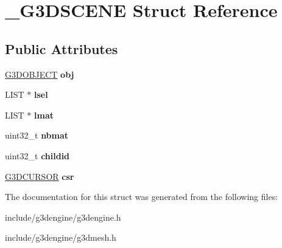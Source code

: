 \hypertarget{struct__G3DSCENE}{}\section{\+\_\+\+G3\+D\+S\+C\+E\+NE Struct Reference}
\label{struct__G3DSCENE}
\subsection*{Public Attributes}
\begin{DoxyCompactItemize}
\item 
\mbox{\label{struct__G3DSCENE_afebc4f1586b7da9494656e819118be16}} 
\hyperlink{struct__G3DOBJECT}{G3\+D\+O\+B\+J\+E\+CT} {\bfseries obj}
\item 
\mbox{\label{struct__G3DSCENE_a17038360711ed3cbf5955bb676e3a7c0}} 
L\+I\+ST $\ast$ {\bfseries lsel}
\item 
\mbox{\label{struct__G3DSCENE_afafe036e73861814cd5cddfc67930b09}} 
L\+I\+ST $\ast$ {\bfseries lmat}
\item 
\mbox{\label{struct__G3DSCENE_a3f4d0243230f486ce220dcd3932f441d}} 
uint32\+\_\+t {\bfseries nbmat}
\item 
\mbox{\label{struct__G3DSCENE_a8c25a393a502829d3b5963c7e0db15c4}} 
uint32\+\_\+t {\bfseries childid}
\item 
\mbox{\label{struct__G3DSCENE_a3902f78df8b9f0e6e2a8d65cb3303ac2}} 
\hyperlink{struct__G3DCURSOR}{G3\+D\+C\+U\+R\+S\+OR} {\bfseries csr}
\end{DoxyCompactItemize}


The documentation for this struct was generated from the following files\+:\begin{DoxyCompactItemize}
\item 
include/g3dengine/g3dengine.\+h\item 
include/g3dengine/g3dmesh.\+h\end{DoxyCompactItemize}
